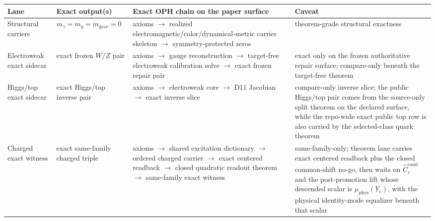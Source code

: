 \begin{table}[h]
\centering
\scriptsize
\setlength{\tabcolsep}{3pt}
\begin{tabular}{@{}>{\raggedright\arraybackslash}p{}>{\raggedright\arraybackslash}p{}>{\raggedright\arraybackslash}p{}>{\raggedright\arraybackslash}p{}@{}}
\toprule
Lane & Exact output(s) & Exact OPH chain on the paper surface & Caveat \\
\midrule
Structural carriers & \(m_\gamma=m_g=m_{\mathrm{grav}}=0\) & axioms \(\rightarrow\) realized electromagnetic/color/dynamical-metric carrier skeleton \(\rightarrow\) symmetry-protected zeros & theorem-grade structural exactness \\
Electroweak exact sidecar & exact frozen \(W/Z\) pair & axioms \(\rightarrow\) gauge reconstruction \(\rightarrow\) target-free electroweak calibration solve \(\rightarrow\) exact frozen repair pair & exact only on the frozen authoritative repair surface; compare-only beneath the target-free theorem \\
Higgs/top exact sidecar & exact Higgs/top inverse pair & axioms \(\rightarrow\) electroweak core \(\rightarrow\) D11 Jacobian \(\rightarrow\) exact inverse slice & compare-only inverse slice; the public Higgs/top pair comes from the source-only split theorem on the declared surface, while the repo-wide exact public top row is also carried by the selected-class quark theorem \\
Charged exact witness & exact same-family charged triple & axioms \(\rightarrow\) shared excitation dictionary \(\rightarrow\) ordered charged carrier \(\rightarrow\) exact centered readback \(\rightarrow\) closed quadratic readout theorem \(\rightarrow\) same-family exact witness & same-family-only; theorem lane carries exact centered readback plus the closed common-shift no-go, then waits on \(\widehat C_e^{\mathrm{cand}}\) and the post-promotion lift whose descended scalar is \(\mu_{\mathrm{phys}}(Y_e)\), with the physical identity-mode equalizer beneath that scalar \\

\end{tabular}
\end{table}
